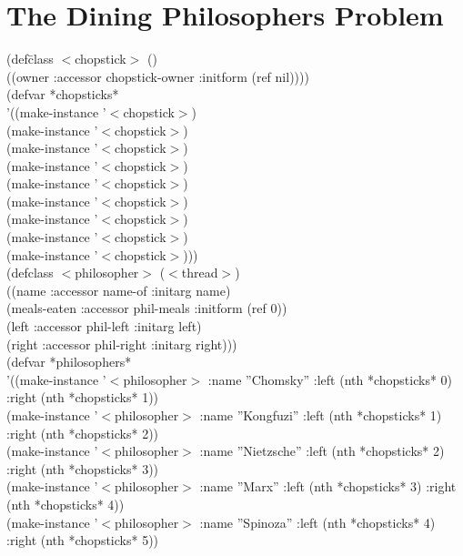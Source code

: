 \documentclass[10pt]{book}
\newenvironment{lisp}{\begin{ttfamily}\begin{tabbing}}{\par\end{tabbing}\end{ttfamily}}
\begin{document}
\section{The Dining Philosophers Problem}
\begin{lisp}
(def\= class $<$chopstick$>$ ()\\ 
\> ((owner :accessor chopstick-owner :initform (ref nil))))\\
(defvar *chopsticks*\\
\> '((make-instance '$<$chopstick$>$)\\
\>   (make-instance '$<$chopstick$>$)\\
\>   (make-instance '$<$chopstick$>$)\\
\>   (make-instance '$<$chopstick$>$)\\
\>   (make-instance '$<$chopstick$>$)\\
\>   (make-instance '$<$chopstick$>$)\\
\>   (make-instance '$<$chopstick$>$)\\
\>   (make-instance '$<$chopstick$>$)\\
\>   (make-instance '$<$chopstick$>$)))\\
(defclass $<$philosopher$>$ ($<$thread$>$)\\
\> ((name :accessor name-of :initarg name)\\
\> (meals-eaten :accessor phil-meals :initform (ref 0)) \\
\> (left :accessor phil-left :initarg left) \\
\> (right :accessor phil-right :initarg right)))\\
(defvar *philosophers*\\
\> '((make-instance '$<$philosopher$>$ :name ''Chomsky'' :left (nth *chopsticks* 0) :right (nth *chopsticks* 1))\\
\>  (make-instance '$<$philosopher$>$ :name ''Kongfuzi'' :left (nth *chopsticks* 1) :right (nth *chopsticks* 2))\\
\>  (make-instance '$<$philosopher$>$ :name ''Nietzsche'' :left (nth *chopsticks* 2) :right (nth *chopsticks* 3))\\ 
\>  (make-instance '$<$philosopher$>$ :name ''Marx'' :left (nth *chopsticks* 3) :right (nth *chopsticks* 4))\\
\>  (make-instance '$<$philosopher$>$ :name  ''Spinoza'' :left (nth *chopsticks* 4) :right (nth *chopsticks* 5))\\

\end{lisp}
\end{document}
